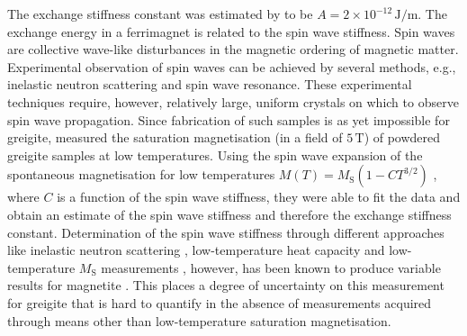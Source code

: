 The exchange stiffness constant was estimated by \citet{Chang2008} to be $A=2\times10^{-12}\,\text{J}/\text{m}$. The exchange energy in a ferrimagnet is related to the spin wave stiffness. Spin waves are collective wave-like disturbances in the magnetic ordering of magnetic matter. Experimental observation of spin waves can be achieved by several methods, e.g., inelastic neutron scattering and spin wave resonance. These experimental techniques require, however, relatively large, uniform crystals on which to observe spin wave propagation. Since fabrication of such samples is as yet impossible for greigite, \citet{Chang2008} measured the saturation magnetisation (in a field of $5\,\text{T}$) of powdered greigite samples at low temperatures. Using the spin wave expansion of the spontaneous magnetisation for low temperatures $M(T)=M_{\text{S}}(1-CT^{3/2})$ \citep{Bloch1932}, where $C$ is a function of the spin wave stiffness, they were able to fit the data and obtain an estimate of the spin wave stiffness and therefore the exchange stiffness constant. Determination of the spin wave stiffness through different approaches like inelastic neutron scattering \citep{Torrie1967}, low-temperature heat capacity \citep{Kenan1963} and low-temperature $M_{\text{S}}$ measurements \citep{Aragon1992}, however, has been known to produce variable results for magnetite \citep{Chang2008}. This places a degree of uncertainty on this measurement for greigite that is hard to quantify in the absence of measurements acquired through means other than low-temperature saturation magnetisation.\par

